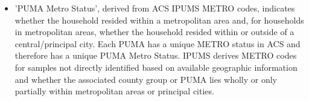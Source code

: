 \begin{itemize}
\item 'PUMA Metro Status', derived from ACS IPUMS METRO codes, indicates whether the household resided within a metropolitan area and, for households in metropolitan areas, whether the household resided within or outside of a central/principal city. Each PUMA has a unique METRO status in ACS and therefore has a unique PUMA Metro Status. IPUMS derives METRO codes for samples not directly identified based on available geographic information and whether the associated county group or PUMA lies wholly or only partially within metropolitan areas or principal cities.
\end{itemize}
